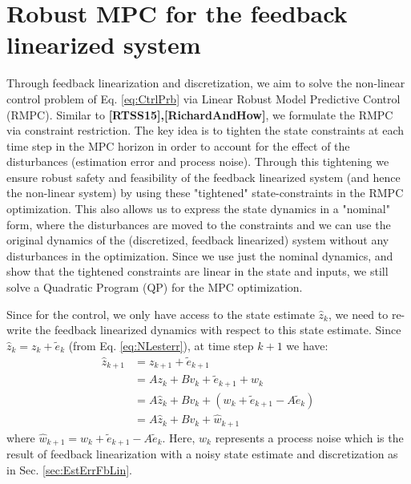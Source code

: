 \section{Robust MPC for the feedback linearized system}

Through feedback linearization and discretization, we aim to solve the non-linear control problem of Eq. \ref{eq:CtrlPrb} via Linear Robust Model Predictive Control (RMPC). Similar to \textbf{[RTSS15],[RichardAndHow]}, we formulate the RMPC via constraint restriction. The key idea is to tighten the state constraints at each time step in the MPC horizon in order to account for the effect of the disturbances (estimation error and process noise). Through this tightening we ensure robust safety and feasibility of the feedback linearized system (and hence the non-linear system) by using these "tightened" state-constraints in the RMPC optimization. This also allows us to express the state dynamics in a "nominal" form, where the disturbances are moved to the constraints and we can use the original dynamics of the (discretized, feedback linearized) system without any disturbances in the optimization. Since we use just the nominal dynamics, and show that the tightened constraints are linear in the state and inputs, we still solve a Quadratic Program (QP) for the MPC optimization.

Since for the control, we only have access to the state estimate $\hat{z}_k$, we need to re-write the feedback linearized dynamics with respect to this state estimate. Since $\hat{z}_k = z_k +\tilde{e}_k$ (from Eq. \ref{eq:NLesterr}), at time step $k+1$ we have:
\begin{subequations} \label{eq:dynamics_estimate}
\begin{align}
\hat{z}_{k+1} &= z_{k+1} + \tilde{e}_{k+1} \\
&=Az_k + Bv_k + \tilde{e}_{k+1} +w_k  \\
&=A\hat{z}_k + Bv_k + (w_k+ \tilde{e}_{k+1} -A \tilde{e}_{k}) \\
&=A\hat{z}_k + Bv_k + \hat{w}_{k+1}
\end{align}
\end{subequations}
where $\hat{w}_{k+1} = w_k+ \tilde{e}_{k+1} -A \tilde{e}_{k}$. Here, $w_k$ represents a process noise which is the result of feedback linearization with a noisy state estimate and discretization as in Sec. \ref{sec:EstErrFbLin}.


